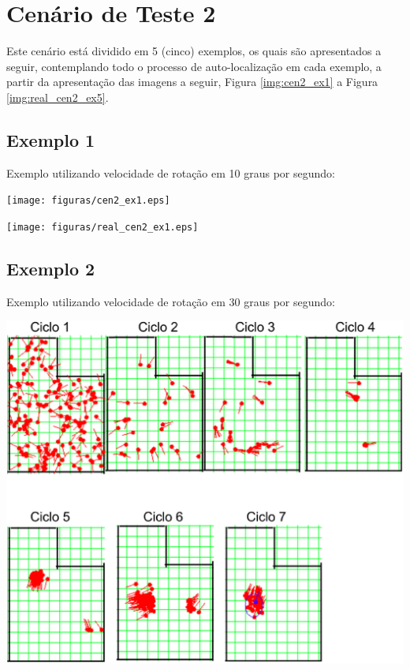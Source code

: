 \section{Cenário de Teste 2}
\label{sec:cenario2}

Este cenário está dividido em 5 (cinco) exemplos, os quais são apresentados a seguir, contemplando todo o processo de auto-localização
em cada exemplo, a partir da apresentação das imagens a seguir, Figura \ref{img:cen2_ex1} a Figura \ref{img:real_cen2_ex5}.

\subsection{Exemplo 1}

Exemplo utilizando velocidade de rotação em 10 graus por segundo:

{\centering
\texttt{[image: figuras/cen2\_ex1.eps]}
\label{img:cen2_ex1}
\par}

{\centering
\texttt{[image: figuras/real\_cen2\_ex1.eps]}
\label{img:real_cen2_ex1}
\par}

\subsection{Exemplo 2}

Exemplo utilizando velocidade de rotação em 30 graus por segundo:

{\centering
\includegraphics[scale=0.4]{figuras/cen2_ex2.eps}
\label{img:cen2_ex2}
\par}

